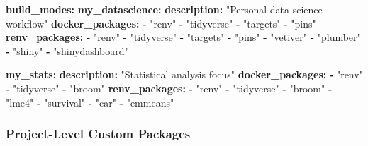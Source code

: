 \documentclass[
]{article}
\newenvironment{Shaded}{\begin{snugshade}}{\end{snugshade}}
\newcommand{\AttributeTok}[1]{\textcolor[rgb]{0.13,0.29,0.53}{#1}}
\newcommand{\FunctionTok}[1]{\textcolor[rgb]{0.13,0.29,0.53}{\textbf{#1}}}
\newcommand{\KeywordTok}[1]{\textcolor[rgb]{0.13,0.29,0.53}{\textbf{#1}}}
\newcommand{\StringTok}[1]{\textcolor[rgb]{0.31,0.60,0.02}{#1}}
\begin{document}
\begin{Shaded}
\begin{Highlighting}[]
\FunctionTok{build\_modes}\KeywordTok{:}
\AttributeTok{  }\FunctionTok{my\_datascience}\KeywordTok{:}
\AttributeTok{    }\FunctionTok{description}\KeywordTok{:}\AttributeTok{ }\StringTok{"Personal data science workflow"}
\AttributeTok{    }\FunctionTok{docker\_packages}\KeywordTok{:}
\AttributeTok{      }\KeywordTok{{-}}\AttributeTok{ }\StringTok{"renv"}
\AttributeTok{      }\KeywordTok{{-}}\AttributeTok{ }\StringTok{"tidyverse"}
\AttributeTok{      }\KeywordTok{{-}}\AttributeTok{ }\StringTok{"targets"}
\AttributeTok{      }\KeywordTok{{-}}\AttributeTok{ }\StringTok{"pins"}
\AttributeTok{    }\FunctionTok{renv\_packages}\KeywordTok{:}
\AttributeTok{      }\KeywordTok{{-}}\AttributeTok{ }\StringTok{"renv"}
\AttributeTok{      }\KeywordTok{{-}}\AttributeTok{ }\StringTok{"tidyverse"}
\AttributeTok{      }\KeywordTok{{-}}\AttributeTok{ }\StringTok{"targets"}
\AttributeTok{      }\KeywordTok{{-}}\AttributeTok{ }\StringTok{"pins"}
\AttributeTok{      }\KeywordTok{{-}}\AttributeTok{ }\StringTok{"vetiver"}
\AttributeTok{      }\KeywordTok{{-}}\AttributeTok{ }\StringTok{"plumber"}
\AttributeTok{      }\KeywordTok{{-}}\AttributeTok{ }\StringTok{"shiny"}
\AttributeTok{      }\KeywordTok{{-}}\AttributeTok{ }\StringTok{"shinydashboard"}

\AttributeTok{  }\FunctionTok{my\_stats}\KeywordTok{:}
\AttributeTok{    }\FunctionTok{description}\KeywordTok{:}\AttributeTok{ }\StringTok{"Statistical analysis focus"}
\AttributeTok{    }\FunctionTok{docker\_packages}\KeywordTok{:}
\AttributeTok{      }\KeywordTok{{-}}\AttributeTok{ }\StringTok{"renv"}
\AttributeTok{      }\KeywordTok{{-}}\AttributeTok{ }\StringTok{"tidyverse"}
\AttributeTok{      }\KeywordTok{{-}}\AttributeTok{ }\StringTok{"broom"}
\AttributeTok{    }\FunctionTok{renv\_packages}\KeywordTok{:}
\AttributeTok{      }\KeywordTok{{-}}\AttributeTok{ }\StringTok{"renv"}
\AttributeTok{      }\KeywordTok{{-}}\AttributeTok{ }\StringTok{"tidyverse"}
\AttributeTok{      }\KeywordTok{{-}}\AttributeTok{ }\StringTok{"broom"}
\AttributeTok{      }\KeywordTok{{-}}\AttributeTok{ }\StringTok{"lme4"}
\AttributeTok{      }\KeywordTok{{-}}\AttributeTok{ }\StringTok{"survival"}
\AttributeTok{      }\KeywordTok{{-}}\AttributeTok{ }\StringTok{"car"}
\AttributeTok{      }\KeywordTok{{-}}\AttributeTok{ }\StringTok{"emmeans"}
\end{Highlighting}
\end{Shaded}

\subsubsection{Project-Level Custom
Packages}\label{project-level-custom-packages}
\end{document}
